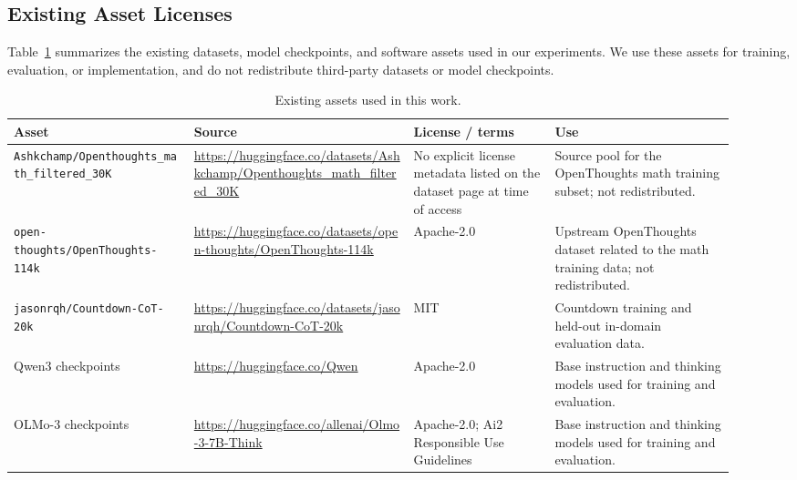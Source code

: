 \subsection{Existing Asset Licenses}
\label{app:asset-licenses}

Table~\ref{tab:asset-licenses} summarizes the existing datasets, model
checkpoints, and software assets used in our experiments. We use these assets
for training, evaluation, or implementation, and do not redistribute
third-party datasets or model checkpoints.

\begin{table}[!htbp]
    \centering
    \scriptsize
    \caption{Existing assets used in this work.}
    \label{tab:asset-licenses}
    \setlength{\tabcolsep}{3pt}
    \renewcommand{\arraystretch}{1.15}
    \begin{tabular}{>{\raggedright\arraybackslash}p{0.23\linewidth}
                    >{\raggedright\arraybackslash}p{0.28\linewidth}
                    >{\raggedright\arraybackslash}p{0.18\linewidth}
                    >{\raggedright\arraybackslash}p{0.23\linewidth}}
        \toprule
        Asset & Source & License / terms & Use \\
        \midrule
        \texttt{Ashkchamp/Openthoughts\_math\_filtered\_30K} &
        \url{https://huggingface.co/datasets/Ashkchamp/Openthoughts_math_filtered_30K} &
        No explicit license metadata listed on the dataset page at time of access &
        Source pool for the OpenThoughts math training subset; not redistributed. \\
        \texttt{open-thoughts/OpenThoughts-114k} &
        \url{https://huggingface.co/datasets/open-thoughts/OpenThoughts-114k} &
        Apache-2.0 &
        Upstream OpenThoughts dataset related to the math training data; not redistributed. \\
        \texttt{jasonrqh/Countdown-CoT-20k} &
        \url{https://huggingface.co/datasets/jasonrqh/Countdown-CoT-20k} &
        MIT &
        Countdown training and held-out in-domain evaluation data. \\
        Qwen3 checkpoints &
        \url{https://huggingface.co/Qwen} &
        Apache-2.0 &
        Base instruction and thinking models used for training and evaluation. \\
        OLMo-3 checkpoints &
        \url{https://huggingface.co/allenai/Olmo-3-7B-Think} &
        Apache-2.0; Ai2 Responsible Use Guidelines &
        Base instruction and thinking models used for training and evaluation. \\

\end{tabular}
\end{table}
